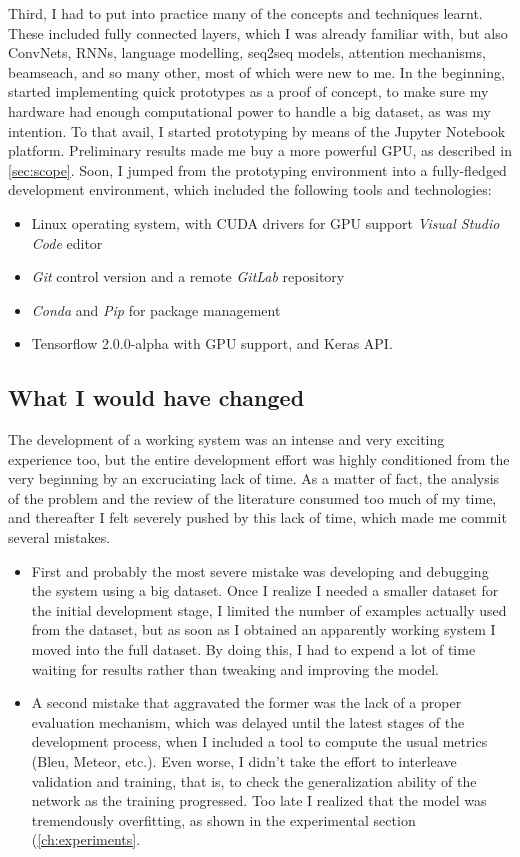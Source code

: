 Third, I had to put into practice many of the concepts and techniques learnt. These included fully connected layers, which I was already familiar with, but also ConvNets, RNNs, language modelling, seq2seq models, attention mechanisms, beamseach, and so many other, most of which were new to me. In the beginning, started implementing quick prototypes as a proof of concept, to make sure my hardware had enough computational power to handle a big dataset, as was my intention. To that avail, I started prototyping  by means of the Jupyter Notebook platform. Preliminary results made me buy a more powerful GPU, as described in \cref{sec:scope}. Soon, I jumped from the prototyping environment into a fully-fledged development environment, which  included the following tools and technologies:

\begin{itemize}
    \item Linux operating system, with CUDA drivers for GPU support
    \textit{Visual Studio Code} editor
    \item \textit{Git} control version and a remote \textit{GitLab} repository
    \item \textit{Conda} and \textit{Pip} for package management
    \item Tensorflow 2.0.0-alpha with GPU support, and Keras API.
\end{itemize}


\subsection{What I would have changed}

The development of a working system was an intense and very exciting experience too, but the entire development effort was highly conditioned from the very beginning by an excruciating lack of time. As a matter of fact, the analysis of the problem and the review of the literature consumed too much of my time, and thereafter I felt severely pushed by this lack of time, which made me commit several mistakes. 

\begin{itemize}
    \item First and probably the most severe mistake was developing and debugging the system using a big dataset. Once I realize I needed a smaller dataset for the initial development stage, I limited the number of examples actually used from the dataset, but as soon as I obtained an apparently working system I moved into the full dataset. By doing this, I had to expend a lot of time waiting for results rather than tweaking and improving the model.
    \item A second mistake that aggravated the former was the lack of a proper evaluation mechanism, which was delayed until the latest stages of the development process, when I included a tool to compute the usual metrics (Bleu, Meteor, etc.). Even worse, I didn't take the effort to interleave validation and training, that is, to check the generalization ability of the network as the training progressed. Too late I realized that the model was tremendously overfitting, as shown in the experimental section (\cref{ch:experiments}.
\end{itemize}

